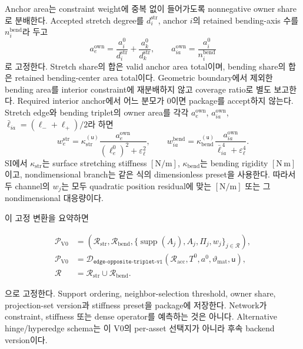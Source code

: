 \documentclass[11pt]{article}
\begin{document}
Anchor area는 constraint weight에 중복 없이 들어가도록 nonnegative owner share로 분배한다.
Accepted stretch degree를 \(d_i^{\mathrm{str}}\), anchor \(i\)의 retained bending-axis 수를
\(n_i^{\mathrm{bend}}\)라 두고
\[
  a_e^{\mathrm{own}}
  =\frac{a_i^0}{d_i^{\mathrm{str}}}+\frac{a_k^0}{d_k^{\mathrm{str}}},
  \qquad
  a_{ia}^{\mathrm{own}}=\frac{a_i^0}{n_i^{\mathrm{bend}}}
\]
로 고정한다. Stretch share의 합은 valid anchor area total이며,
bending share의 합은 retained bending-center area total이다.
Geometric boundary에서 제외한 bending area를 interior constraint에 재분배하지 않고
coverage ratio로 별도 보고한다. Required interior anchor에서 어느 분모가 0이면 package를 accept하지 않는다.
Stretch edge와 bending triplet의 owner area를 각각
\(a_e^{\mathrm{own}}\), \(a_{ia}^{\mathrm{own}}\),
\(\bar\ell_{ia}=(\ell_-+\ell_+)/2\)라 하면
\[
  w_e^{\mathrm{str}}
  =\kappa_{\mathrm{str}}^{(\mathsf u)}
   \frac{a_e^{\mathrm{own}}}{(\ell_e^0)^2+\varepsilon_\ell^2},
  \qquad
  w_{ia}^{\mathrm{bend}}
  =\kappa_{\mathrm{bend}}^{(\mathsf u)}
   \frac{a_{ia}^{\mathrm{own}}}{\bar\ell_{ia}^{\,4}+\varepsilon_\ell^4}.
\]
SI에서 \(\kappa_{\mathrm{str}}\)는 surface stretching stiffness \([\mathrm{N}/\mathrm m]\),
\(\kappa_{\mathrm{bend}}\)는 bending rigidity \([\mathrm{N}\,\mathrm m]\)이고,
nondimensional branch는 같은 식의 dimensionless preset을 사용한다.
따라서 두 channel의 \(w_j\)는 모두 quadratic position residual에 맞는 \([\mathrm N/\mathrm m]\) 또는
그 nondimensional 대응량이다.

이 고정 변환을 요약하면

\begin{equation}
\begin{aligned}
  \mathcal P_{\mathrm{V0}}
  &=\left(
    \mathcal R_{\mathrm{str}},\mathcal R_{\mathrm{bend}},
    \{\operatorname{supp}(A_j),A_j,\Pi_j,w_j\}_{j\in\mathcal R}
  \right),\\
  \mathcal P_{\mathrm{V0}}
  &=
  \mathcal D_{\texttt{edge-opposite-triplet-v1}}
  \left(\mathcal R_{\mathrm{acc}},T^0,a^0,
  \vartheta_{\mathrm{mat}},\mathsf u\right),\\
  \mathcal R&=\mathcal R_{\mathrm{str}}\cup\mathcal R_{\mathrm{bend}}.
\end{aligned}
  \label{eq:minimal-topology-to-constraints}
\end{equation}

으로 고정한다. Support ordering, neighbor-selection threshold, owner share,
projection-set version과 stiffness preset을 package에 저장한다.
Network가 constraint, stiffness 또는 dense operator를 예측하는 것은 아니다.
Alternative hinge/hyperedge schema는 이 V0의 per-asset 선택지가 아니라 후속 backend version이다.
\end{document}
